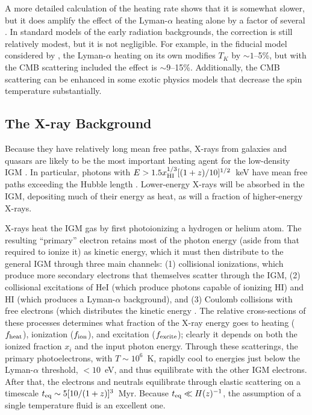 A more detailed calculation of the heating rate shows that it is somewhat slower, but it does amplify the effect of the Lyman-$\alpha$ heating alone by a factor of several \cite{venumadhav18}. In standard models of the early radiation backgrounds, the correction is still relatively modest, but it is not negligible. For example, in the fiducial model considered by \cite{venumadhav18}, the Lyman-$\alpha$ heating on its own modifies $T_K$ by $\sim 1$--5\%, but with the CMB scattering included the effect is $\sim 9$--15\%. Additionally, the CMB scattering can be enhanced in some exotic physics models that decrease the spin temperature substantially.

\subsection{The X-ray Background} \label{sec:ch1_xrb} 

Because they have relatively long mean free paths, X-rays from galaxies and quasars are likely to be the most important heating agent for the low-density IGM  \cite{madau97}.  In particular, photons with $E>1.5 x_{\rm HI}^{1/3} [(1+z)/10]^{1/2}$~keV have mean free paths exceeding the Hubble length \cite{oh01}.  Lower-energy X-rays will be absorbed in the IGM, depositing much of their energy as heat, as will a fraction of higher-energy X-rays.

X-rays heat the IGM gas by first photoionizing a hydrogen or helium atom.  The resulting ``primary'' electron retains most of the photon energy (aside from that required to ionize it) as kinetic energy, which it must then distribute to the general IGM through three main channels: (1) collisional ionizations, which produce more secondary electrons that themselves scatter through the IGM, (2) collisional excitations of HeI (which produce photons capable of ionizing HI) and HI (which produces a Lyman-$\alpha$ background), and (3) Coulomb collisions with free electrons (which distributes the kinetic energy .  The relative cross-sections of these processes determines what fraction of the X-ray energy goes to heating ($f_{\rm heat}$), ionization ($f_{\rm ion}$), and excitation ($f_{\rm excite}$); clearly it depends on both the ionized fraction $x_i$ and the input photon energy.  Through these scatterings, the primary photoelectrons, with $T \sim 10^6$~K, rapidly cool to energies just below the Lyman-$\alpha$ threshold, $<10$~eV, and thus equilibrate with the other IGM electrons.  After that, the electrons and neutrals equilibrate through elastic scattering on a timescale $t_{\rm eq} \sim 5 [10/(1+z)]^3$~Myr.  Because $t_{\rm eq} \ll H(z)^{-1}$, the assumption of a single temperature fluid is an excellent one.

